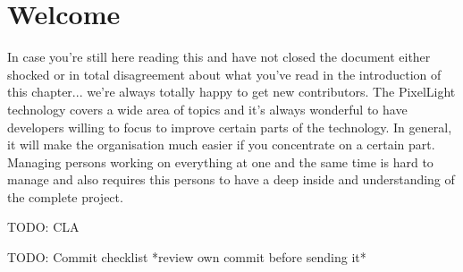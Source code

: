 \section{Welcome}
In case you're still here reading this and have not closed the document either shocked or in total disagreement about what you've read in the introduction of this chapter... we're always totally happy to get new contributors. The PixelLight technology covers a wide area of topics and it's always wonderful to have developers willing to focus to improve certain parts of the technology. In general, it will make the organisation much easier if you concentrate on a certain part. Managing persons working on everything at one and the same time is hard to manage and also requires this persons to have a deep inside and understanding of the complete project.

TODO: CLA

TODO: Commit checklist *review own commit before sending it*